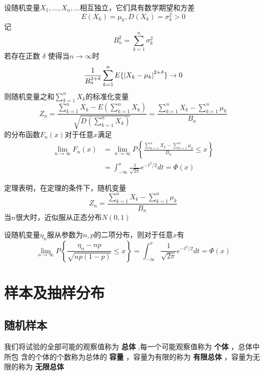 \documentclass[11pt]{article}
\begin{document}
\begin{theorem}[李雅普诺夫定理]
设随机变量\(X_1,\dots,X_n,\dots\)相互独立，它们具有数学期望和方差
\begin{equation*}
E(X_k)=\mu_k,D(X_k)=\sigma^2_k>0
\end{equation*}
记
\begin{equation*}
B_n^2=\sum_{k=1}^n\sigma^2_k
\end{equation*}
若存在正数 \(\delta\) 使得当\(n\to\infty\)时
\begin{equation*}
\frac{1}{B_n^{2+\delta}}\sum_{k=1}^nE\{\abs{X_k-\mu_k}^{2+\delta}\}\to0
\end{equation*}
则随机变量之和\(\sum_{k=1}^nX_k\)的标准化变量
\begin{equation*}
Z_n=\frac{\sum_{k=1}^nX_k-E(\sum_{k=1}^nX_k)}{\sqrt{D(\sum_{k=1}^nX_k)}}=
\frac{\sum_{k=1}^nX_k-\sum_{k=1}^n\mu_k}{B_n}
\end{equation*}
的分布函数\(F_n(x)\)对于任意\(x\)满足
\begin{align*}
\lim_{n\to\infty}F_n(x)&=
\lim_{n\to\infty}P\left\{
\frac{\sum_{k=1}^nX_k-\sum_{k=1}^n\mu_k}{B_n}\le x
\right\}\\
&=\int_{-\infty}^x\frac{1}{\sqrt{2\pi}}e^{-t^2/2}dt=\Phi(x)
\end{align*}
\end{theorem}

定理表明，在定理的条件下，随机变量
\begin{equation*}
Z_n=\frac{\sum_{k=1}^nX_k-\sum_{k=1}^n\mu_k}{B_n}
\end{equation*}
当\(n\)很大时，近似服从正态分布\(N(0,1)\)

\begin{theorem}
设随机变量\(\eta_n\)服从参数为\(n,p\)的二项分布，则对于任意\(x\)有
\begin{equation*}
\lim_{n\to\infty}P\left\{
\frac{\eta_n-np}{\sqrt{np(1-p)}}\le x
\right\}=\int_{-\infty}^x\frac{1}{\sqrt{2\pi}}e^{-t^2/2}dt=\Phi(x)
\end{equation*}
\end{theorem}
\section{样本及抽样分布}
\label{sec:orgea80c16}
\subsection{随机样本}
\label{sec:orgae22e88}
我们将试验的全部可能的观察值称为 \textbf{总体} ,每一个可能观察值称为 \textbf{个体} ，总体中所包
含的个体的个数称为总体的 \textbf{容量} ，容量为有限的称为 \textbf{有限总体} ，容量为无限的称为
\textbf{无限总体}
\end{document}
